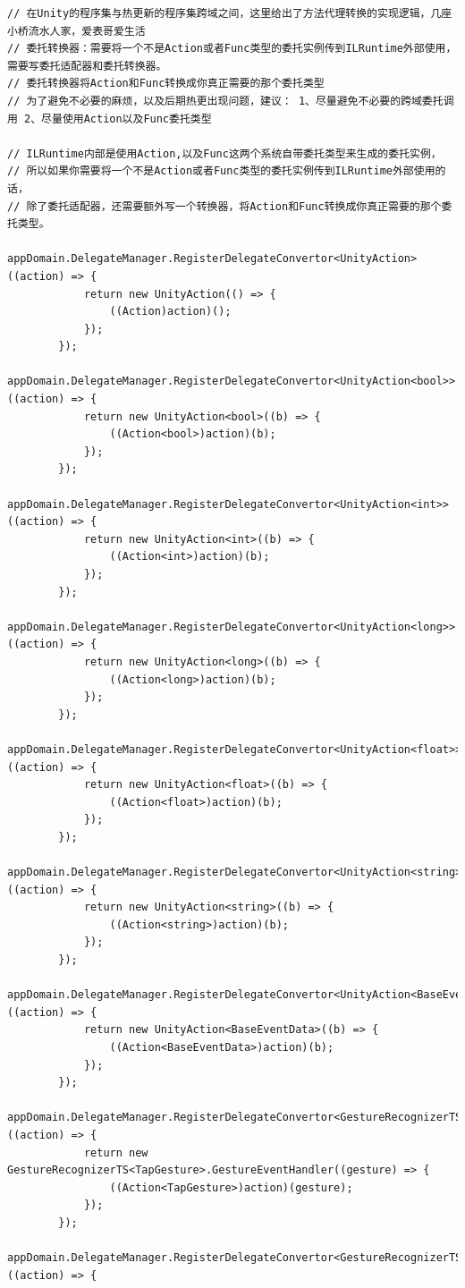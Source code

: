 \documentclass[9pt, b5paper]{article}
\begin{document}
\begin{verbatim}
// 在Unity的程序集与热更新的程序集跨域之间，这里给出了方法代理转换的实现逻辑，几座小桥流水人家，爱表哥爱生活
// 委托转换器：需要将一个不是Action或者Func类型的委托实例传到ILRuntime外部使用，需要写委托适配器和委托转换器。
// 委托转换器将Action和Func转换成你真正需要的那个委托类型
// 为了避免不必要的麻烦，以及后期热更出现问题，建议： 1、尽量避免不必要的跨域委托调用 2、尽量使用Action以及Func委托类型

// ILRuntime内部是使用Action,以及Func这两个系统自带委托类型来生成的委托实例，
// 所以如果你需要将一个不是Action或者Func类型的委托实例传到ILRuntime外部使用的话，
// 除了委托适配器，还需要额外写一个转换器，将Action和Func转换成你真正需要的那个委托类型。
        appDomain.DelegateManager.RegisterDelegateConvertor<UnityAction>((action) => {
            return new UnityAction(() => {
                ((Action)action)();
            });
        });
        appDomain.DelegateManager.RegisterDelegateConvertor<UnityAction<bool>>((action) => {
            return new UnityAction<bool>((b) => {
                ((Action<bool>)action)(b);
            });
        });
        appDomain.DelegateManager.RegisterDelegateConvertor<UnityAction<int>>((action) => {
            return new UnityAction<int>((b) => {
                ((Action<int>)action)(b);
            });
        });
        appDomain.DelegateManager.RegisterDelegateConvertor<UnityAction<long>>((action) => {
            return new UnityAction<long>((b) => {
                ((Action<long>)action)(b);
            });
        });
        appDomain.DelegateManager.RegisterDelegateConvertor<UnityAction<float>>((action) => {
            return new UnityAction<float>((b) => {
                ((Action<float>)action)(b);
            });
        });
        appDomain.DelegateManager.RegisterDelegateConvertor<UnityAction<string>>((action) => {
            return new UnityAction<string>((b) => {
                ((Action<string>)action)(b);
            });
        });
        appDomain.DelegateManager.RegisterDelegateConvertor<UnityAction<BaseEventData>>((action) => {
            return new UnityAction<BaseEventData>((b) => {
                ((Action<BaseEventData>)action)(b);
            });
        });
        appDomain.DelegateManager.RegisterDelegateConvertor<GestureRecognizerTS<TapGesture>.GestureEventHandler>((action) => {
            return new GestureRecognizerTS<TapGesture>.GestureEventHandler((gesture) => {
                ((Action<TapGesture>)action)(gesture);
            });
        });
        appDomain.DelegateManager.RegisterDelegateConvertor<GestureRecognizerTS<LongPressGesture>.GestureEventHandler>((action) => {

\end{verbatim}
\end{document}
